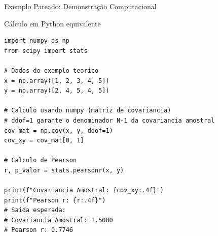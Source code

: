 \begin{frame}[fragile]{Exemplo Pareado: Demonstração Computacional}
    \begin{block}{Cálculo em Python equivalente}
\begin{lstlisting}
import numpy as np
from scipy import stats

# Dados do exemplo teorico
x = np.array([1, 2, 3, 4, 5])
y = np.array([2, 4, 5, 4, 5])

# Calculo usando numpy (matriz de covariancia)
# ddof=1 garante o denominador N-1 da covariancia amostral
cov_mat = np.cov(x, y, ddof=1)
cov_xy = cov_mat[0, 1]

# Calculo de Pearson
r, p_valor = stats.pearsonr(x, y)

print(f"Covariancia Amostral: {cov_xy:.4f}")
print(f"Pearson r: {r:.4f}")
# Saida esperada:
# Covariancia Amostral: 1.5000
# Pearson r: 0.7746
\end{lstlisting}
    \end{block}
\end{frame}
